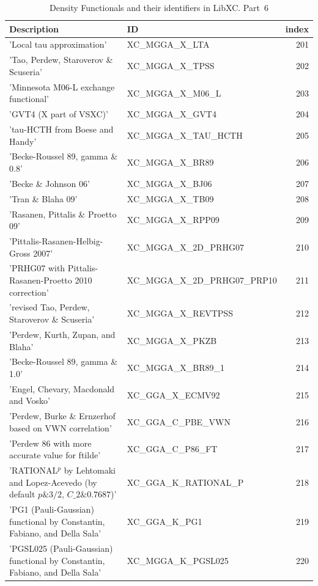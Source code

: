 \documentclass[final,12pt]{article}
\begin{document}
{{{{{{\begin{table}[!h]
\caption{Density Functionals and their identifiers in LibXC. Part~6}
\begin{center}
\begin{tabular}{llr}
\hline
\hline
Description & ID & index\\
\hline
  'Local tau approximation' & XC\_MGGA\_X\_LTA  &201\\
  'Tao, Perdew, Staroverov \& Scuseria' & XC\_MGGA\_X\_TPSS  &202\\
  'Minnesota M06-L exchange functional' & XC\_MGGA\_X\_M06\_L  &203\\
  'GVT4 (X part of VSXC)' & XC\_MGGA\_X\_GVT4  &204\\
  'tau-HCTH from Boese and Handy' & XC\_MGGA\_X\_TAU\_HCTH  &205\\
  'Becke-Roussel 89, gamma \& 0.8' & XC\_MGGA\_X\_BR89  &206\\
  'Becke \& Johnson 06' & XC\_MGGA\_X\_BJ06  &207\\
  'Tran \& Blaha 09' & XC\_MGGA\_X\_TB09  &208\\
  'Rasanen, Pittalis \& Proetto 09' & XC\_MGGA\_X\_RPP09  &209\\
  'Pittalis-Rasanen-Helbig-Gross 2007' & XC\_MGGA\_X\_2D\_PRHG07  &210\\
  'PRHG07 with Pittalis-Rasanen-Proetto 2010 correction' & XC\_MGGA\_X\_2D\_PRHG07\_PRP10  &211\\
  'revised Tao, Perdew, Staroverov \& Scuseria' & XC\_MGGA\_X\_REVTPSS  &212\\
  'Perdew, Kurth, Zupan, and Blaha' & XC\_MGGA\_X\_PKZB  &213\\
  'Becke-Roussel 89, gamma \& 1.0' & XC\_MGGA\_X\_BR89\_1  &214\\
  'Engel, Chevary, Macdonald and Vosko' & XC\_GGA\_X\_ECMV92  &215\\
  'Perdew, Burke \& Ernzerhof based on VWN correlation' & XC\_GGA\_C\_PBE\_VWN  &216\\
  'Perdew 86 with more accurate value for ftilde' & XC\_GGA\_C\_P86\_FT  &217\\
  'RATIONAL$^{p}$ by Lehtomaki and Lopez-Acevedo (by default $p\&3/2$, $C\_{2}\&0.7687$)' & XC\_GGA\_K\_RATIONAL\_P  &218\\
  'PG1 (Pauli-Gaussian) functional by Constantin, Fabiano, and Della Sala' & XC\_GGA\_K\_PG1  &219\\
  'PGSL025 (Pauli-Gaussian) functional by Constantin, Fabiano, and Della Sala' & XC\_MGGA\_K\_PGSL025  &220\\

\end{tabular}
\end{center}
\end{table}}}}}}}
\end{document}
